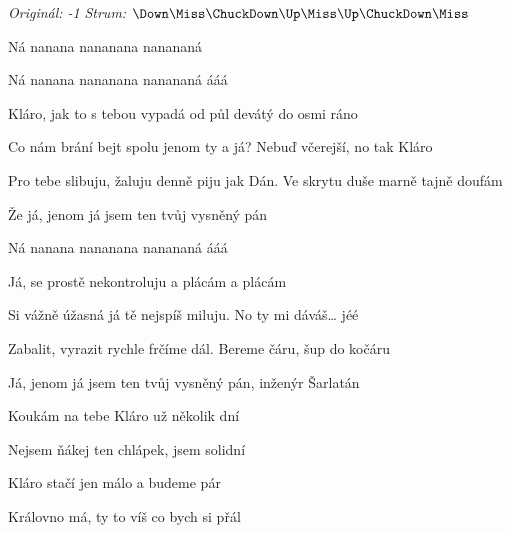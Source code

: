 \begin{song}


\begin{headerbox}
\RaiseBoxWithAccents
\textit{Originál: -1} \quad
\textit{Strum:} $\Down\Miss\ChuckDown\Up\Miss\Up\ChuckDown\Miss$
\end{headerbox}

\begin{hchordbox}
\normalsize
{}
\large
\end{hchordbox}

\bigskip

Ná nanana nananana nanananá   \par
{}Ná nanana nananana nanananá ááá \par

\bigskip

Kláro, jak to s tebou vypadá od půl devátý do osmi ráno \par
Co nám brání bejt spolu jenom ty a já? Nebuď včerejší, no tak Kláro \par
Pro tebe slibuju, žaluju denně piju jak Dán.  Ve skrytu duše marně tajně doufám \par
Že já, jenom já jsem ten tvůj vysněný pán  \par
{}Ná nanana nananana nanananá ááá \par

\bigskip

Já, se prostě nekontroluju a plácám a plácám \par
Si vážně úžasná já tě nejspíš miluju. No ty mi dáváš… jéé \par
{}Zabalit, vyrazit rychle frčíme dál.  Bereme čáru,  šup do kočáru \par
{}Já, jenom já jsem ten tvůj vysněný pán, inženýr Šarlatán \par

\bigskip

Koukám na tebe Kláro už několik dní   \par
{}Nejsem ňákej ten chlápek, jsem solidní   \par
{}Kláro stačí jen málo a budeme pár   \par
{}Královno má, ty to víš co bych si přál    \par


\end{song}
